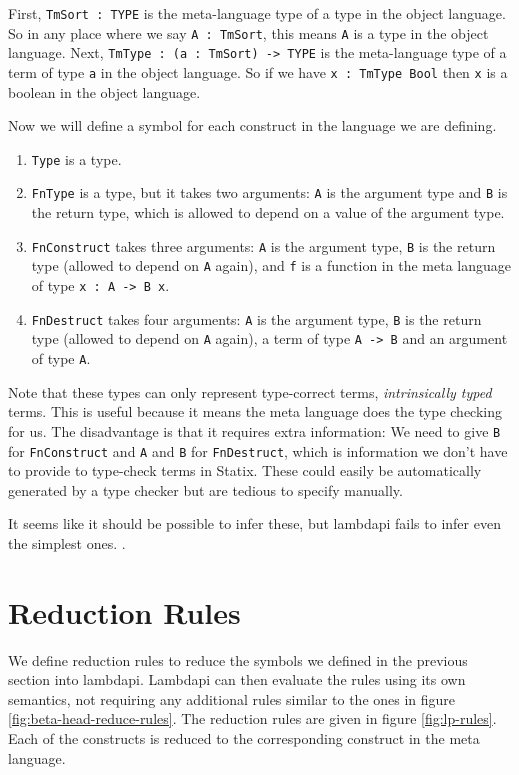 First, \verb|TmSort : TYPE| is the meta-language type of a type in the object language. So in any place where we say \verb|A : TmSort|, this means \verb|A| is a type in the object language. Next, \verb|TmType : (a : TmSort) -> TYPE| is the meta-language type of a term of type \verb|a| in the object language. So if we have \verb|x : TmType Bool| then \verb|x| is a boolean in the object language. 

Now we will define a symbol for each construct in the language we are defining.
\begin{enumerate}
	\item \verb|Type| is a type.
	\item \verb|FnType| is a type, but it takes two arguments: \verb|A| is the argument type and \verb|B| is the return type, which is allowed to depend on a value of the argument type.
	\item \verb|FnConstruct| takes three arguments: \verb|A| is the argument type, \verb|B| is the return type (allowed to depend on \verb|A| again), and \verb|f| is a function in the meta language of type \verb|x : A -> B x|.
	\item \verb|FnDestruct| takes four arguments: \verb|A| is the argument type, \verb|B| is the return type (allowed to depend on \verb|A| again), a term of type \verb|A -> B| and an argument of type \verb|A|. 
\end{enumerate}

Note that these types can only represent type-correct terms, \emph{intrinsically typed} terms. This is useful because it means the meta language does the type checking for us. The disadvantage is that it requires extra information: We need to give \verb|B| for \verb|FnConstruct| and \verb|A| and \verb|B| for \verb|FnDestruct|, which is information we don't have to provide to type-check terms in Statix. These could easily be automatically generated by a type checker but are tedious to specify manually. 

It seems like it should be possible to infer these, but lambdapi fails to infer even the simplest ones. .

\section{Reduction Rules}

We define reduction rules to reduce the symbols we defined in the previous section into lambdapi. Lambdapi can then evaluate the rules using its own semantics, not requiring any additional rules similar to the ones in figure \ref{fig:beta-head-reduce-rules}. The reduction rules are given in figure \ref{fig:lp-rules}. Each of the constructs is reduced to the corresponding construct in the meta language.


